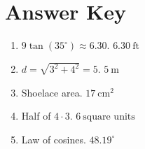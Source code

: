 \documentclass[12pt]{article}
\begin{document}
\section*{Answer Key}
\begin{enumerate}
  \item $9\tan(35^\circ) \approx 6.30$. \quad $\boxed{6.30\ \text{ft}}$
  \item $d = \sqrt{3^2 + 4^2} = 5$. \quad $\boxed{5\ \text{m}}$
  \item Shoelace area. \quad $\boxed{17\ \text{cm}^2}$
  \item Half of $4 \cdot 3$. \quad $\boxed{6\ \text{square units}}$
  \item Law of cosines. \quad $\boxed{48.19^\circ}$
\end{enumerate}
\end{document}
